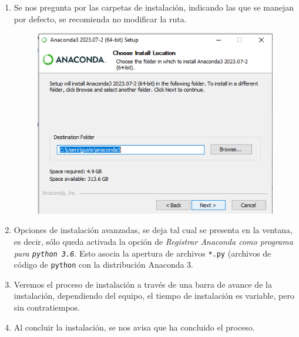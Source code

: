 \documentclass[12pt]{article}
\begin{document}
\begin{enumerate}
\begin{figure}[H]
\end{figure}
\item Se nos pregunta por las carpetas de instalación, indicando las que se manejan por defecto, se recomienda no modificar la ruta.
\begin{figure}[H]
	\centering
	\includegraphics[scale=0.5]{Imagenes/Nueva_Instalacion_Windows_05.png} 
\end{figure}
\item Opciones de instalación avanzadas, se deja tal cual se presenta en la ventana, es decir, sólo queda activada la opción de \emph{Registrar Anaconda como programa para \texttt{python 3.6}}. Esto asocia la apertura de archivos \texttt{*.py} (archivos de código de \texttt{python} con la distribución Anaconda 3.
\item Veremos el proceso de instalación a través de una barra de avance de la instalación, dependiendo del equipo, el tiempo de instalación es variable, pero sin contratiempos.
\item Al concluir la instalación, se nos avisa que ha concluido el proceso.

\end{enumerate}
\end{document}
